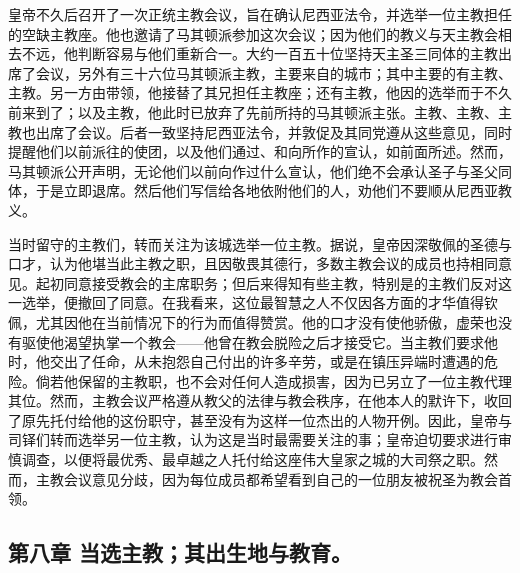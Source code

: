 皇帝不久后召开了一次正统主教会议，旨在确认尼西亚法令，并选举一位主教担任的空缺主教座。他也邀请了马其顿派参加这次会议；因为他们的教义与天主教会相去不远，他判断容易与他们重新合一。大约一百五十位坚持天主圣三同体的主教出席了会议，另外有三十六位马其顿派主教，主要来自的城市；其中主要的有主教、主教。另一方由带领，他接替了其兄担任主教座；还有主教，他因的选举而于不久前来到了；以及主教，他此时已放弃了先前所持的马其顿派主张。主教、主教、主教也出席了会议。后者一致坚持尼西亚法令，并敦促及其同党遵从这些意见，同时提醒他们以前派往的使团，以及他们通过、和向所作的宣认，如前面所述。然而，马其顿派公开声明，无论他们以前向作过什么宣认，他们绝不会承认圣子与圣父同体，于是立即退席。然后他们写信给各地依附他们的人，劝他们不要顺从尼西亚教义。\par

当时留守的主教们，转而关注为该城选举一位主教。据说，皇帝因深敬佩的圣德与口才，认为他堪当此主教之职，且因敬畏其德行，多数主教会议的成员也持相同意见。起初同意接受教会的主席职务；但后来得知有些主教，特别是的主教们反对这一选举，便撤回了同意。在我看来，这位最智慧之人不仅因各方面的才华值得钦佩，尤其因他在当前情况下的行为而值得赞赏。他的口才没有使他骄傲，虚荣也没有驱使他渴望执掌一个教会——他曾在教会脱险之后才接受它。当主教们要求他时，他交出了任命，从未抱怨自己付出的许多辛劳，或是在镇压异端时遭遇的危险。倘若他保留的主教职，也不会对任何人造成损害，因为已另立了一位主教代理其位。然而，主教会议严格遵从教父的法律与教会秩序，在他本人的默许下，收回了原先托付给他的这份职守，甚至没有为这样一位杰出的人物开例。因此，皇帝与司铎们转而选举另一位主教，认为这是当时最需要关注的事；皇帝迫切要求进行审慎调查，以便将最优秀、最卓越之人托付给这座伟大皇家之城的大司祭之职。然而，主教会议意见分歧，因为每位成员都希望看到自己的一位朋友被祝圣为教会首领。\par


\subsection{第八章 当选主教；其出生地与教育。}

